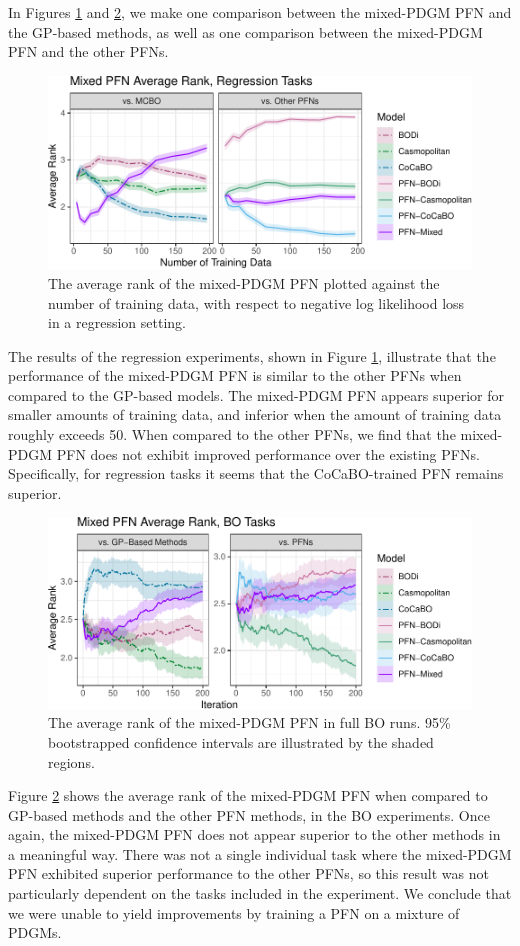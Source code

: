 \documentclass[12pt,twoside]{reedthesis}
\begin{document}
In Figures \ref{fig:mixed-regression-ranks} and \ref{fig:mixed-bo-ranks}, we make one comparison between the mixed-PDGM PFN and the GP-based methods, as well as one comparison between the mixed-PDGM PFN and the other PFNs.
\begin{figure}
\centering
\includegraphics{thesis_files/figure-latex/mixed-regression-ranks-1.pdf}
\caption{\label{fig:mixed-regression-ranks}The average rank of the mixed-PDGM PFN plotted against the number of training data, with respect to negative log likelihood loss in a regression setting.}
\end{figure}
The results of the regression experiments, shown in Figure \ref{fig:mixed-regression-ranks}, illustrate that the performance of the mixed-PDGM PFN is similar to the other PFNs when compared to the GP-based models. The mixed-PDGM PFN appears superior for smaller amounts of training data, and inferior when the amount of training data roughly exceeds 50. When compared to the other PFNs, we find that the mixed-PDGM PFN does not exhibit improved performance over the existing PFNs. Specifically, for regression tasks it seems that the CoCaBO-trained PFN remains superior.
\begin{figure}
\centering
\includegraphics{thesis_files/figure-latex/mixed-bo-ranks-1.pdf}
\caption{\label{fig:mixed-bo-ranks}The average rank of the mixed-PDGM PFN in full BO runs. 95\% bootstrapped confidence intervals are illustrated by the shaded regions.}
\end{figure}
Figure \ref{fig:mixed-bo-ranks} shows the average rank of the mixed-PDGM PFN when compared to GP-based methods and the other PFN methods, in the BO experiments. Once again, the mixed-PDGM PFN does not appear superior to the other methods in a meaningful way. There was not a single individual task where the mixed-PDGM PFN exhibited superior performance to the other PFNs, so this result was not particularly dependent on the tasks included in the experiment. We conclude that we were unable to yield improvements by training a PFN on a mixture of PDGMs.
\end{document}
